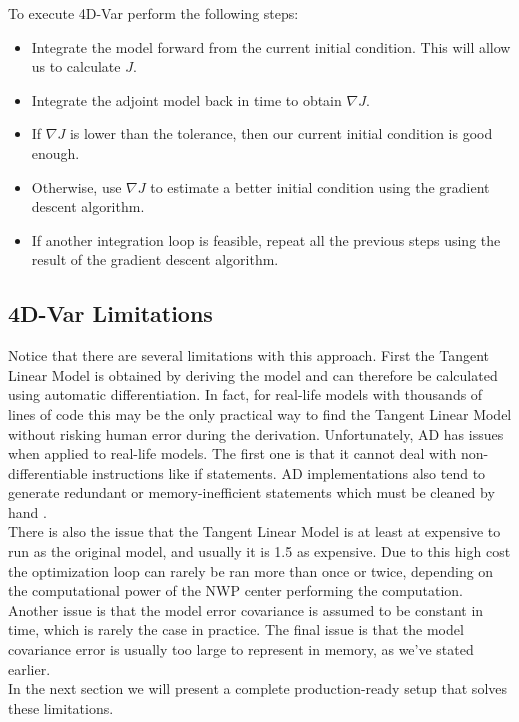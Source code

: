 \documentclass{article}
\begin{document}
To execute 4D-Var perform the following steps:

\begin{itemize}
\item Integrate the model forward from the current initial condition. This will allow us to calculate $J$.
\item Integrate the adjoint model back in time to obtain $\nabla J$.
\item If $\nabla J$ is lower than the tolerance, then our current initial condition is good enough.
\item Otherwise, use $\nabla J$ to estimate a better initial condition using the gradient descent algorithm.
\item If another integration loop is feasible, repeat all the previous steps using the result of the gradient descent algorithm.
\end{itemize}

\subsection{4D-Var Limitations}

Notice that there are several limitations with this approach. First the Tangent Linear Model is obtained by deriving the model and can therefore be calculated using automatic differentiation. In fact, for real-life models with thousands of lines of code this may be the only practical way to find the Tangent Linear Model without risking human error during the derivation. Unfortunately, AD has issues when applied to real-life models. The first one is that it cannot deal with non-differentiable instructions like if statements. AD implementations also tend to generate redundant or memory-inefficient statements which must be cleaned by hand \cite{Giering1998}. \\

There is also the issue that the Tangent Linear Model is at least at expensive to run as the original model, and usually it is 1.5 as expensive. Due to this high cost the optimization loop can rarely be ran more than once or twice, depending on the computational power of the NWP center performing the computation. Another issue is that the model error covariance is assumed to be constant in time, which is rarely the case in practice. The final issue is that the model covariance error is usually too large to represent in memory, as we've stated earlier. \\

In the next section we will present a complete production-ready setup that solves these limitations. \\
\end{document}
